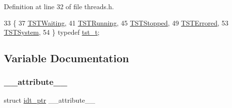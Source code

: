 Definition at line 32 of file threads.\+h.


\begin{DoxyCode}
33 \{
37     \hyperlink{a00065_a3895f03bb811310833570ff0b8a403d9_a3895f03bb811310833570ff0b8a403d9a4e9798f9291920da4dba13ed8d1bf2b4}{TSTWaiting},
41     \hyperlink{a00065_a3895f03bb811310833570ff0b8a403d9_a3895f03bb811310833570ff0b8a403d9ac0336457632847436b12bd36b2642808}{TSTRunning},
45     \hyperlink{a00065_a3895f03bb811310833570ff0b8a403d9_a3895f03bb811310833570ff0b8a403d9a29a580a1a7b4350246c83d171567f7fc}{TSTStopped},
49     \hyperlink{a00065_a3895f03bb811310833570ff0b8a403d9_a3895f03bb811310833570ff0b8a403d9a8117b53a7299ca12df9b2a7bd320689f}{TSTErrored},
53     \hyperlink{a00065_a3895f03bb811310833570ff0b8a403d9_a3895f03bb811310833570ff0b8a403d9a1b2cdb1c39a3cb21ddb3efc42d1cc5b9}{TSTSystem},
54 \} \textcolor{keyword}{typedef} \hyperlink{a00065_a3895f03bb811310833570ff0b8a403d9_a3895f03bb811310833570ff0b8a403d9}{tst\_t};
\end{DoxyCode}


\subsection{Variable Documentation}
\mbox{\label{a00065_acf8c839d8a7a12772ebd4b8a4c087034_acf8c839d8a7a12772ebd4b8a4c087034}} 
\subsubsection{\texorpdfstring{\+\_\+\+\_\+attribute\+\_\+\+\_\+}{\_\_attribute\_\_}}
{\footnotesize\ttfamily struct \hyperlink{a00103}{idt\+\_\+ptr} \+\_\+\+\_\+attribute\+\_\+\+\_\+}

